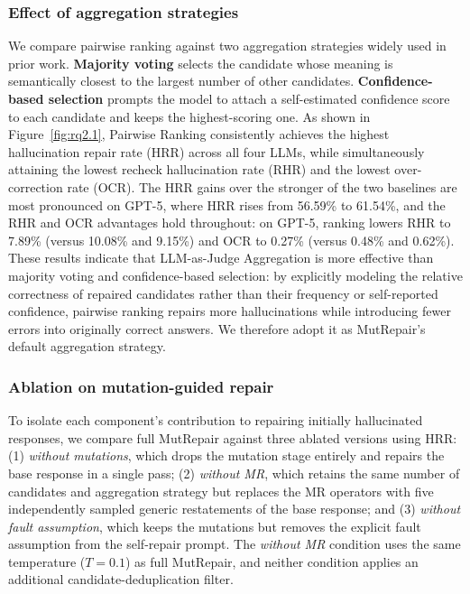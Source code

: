 \documentclass[acmsmall,screen,review,anonymous]{acmart}
\begin{document}
\subsubsection{Effect of aggregation strategies}
We compare pairwise ranking against two aggregation strategies widely used in prior work. \textbf{Majority voting} selects the candidate whose meaning is semantically closest to the largest number of other candidates. \textbf{Confidence-based selection} prompts the model to attach a self-estimated confidence score to each candidate and keeps the highest-scoring one.
As shown in Figure~\ref{fig:rq2.1}, Pairwise Ranking consistently achieves the highest hallucination repair rate (HRR) across all four LLMs, while simultaneously attaining the lowest recheck hallucination rate (RHR) and the lowest over-correction rate (OCR). The HRR gains over the stronger of the two baselines are most pronounced on GPT-5, where HRR rises from 56.59\% to 61.54\%, and the RHR and OCR advantages hold throughout: on GPT-5, ranking lowers RHR to 7.89\% (versus 10.08\% and 9.15\%) and OCR to 0.27\% (versus 0.48\% and 0.62\%).
These results indicate that LLM-as-Judge Aggregation is more effective than majority voting and confidence-based selection: by explicitly modeling the relative correctness of repaired candidates rather than their frequency or self-reported confidence, pairwise ranking repairs more hallucinations while introducing fewer errors into originally correct answers. We therefore adopt it as MutRepair's default aggregation strategy.


\subsubsection{Ablation on mutation-guided repair}
To isolate each component's contribution to repairing initially hallucinated responses, we compare full MutRepair against three ablated versions using HRR: (1) \emph{without mutations}, which drops the mutation stage entirely and repairs the base response in a single pass; (2) \emph{without MR}, which retains the same number of candidates and aggregation strategy but replaces the MR operators with five independently sampled generic restatements of the base response; and (3) \emph{without fault assumption}, which keeps the mutations but removes the explicit fault assumption from the self-repair prompt. The \emph{without MR} condition uses the same temperature ($T=0.1$) as full MutRepair, and neither condition applies an additional candidate-deduplication filter.
\end{document}
